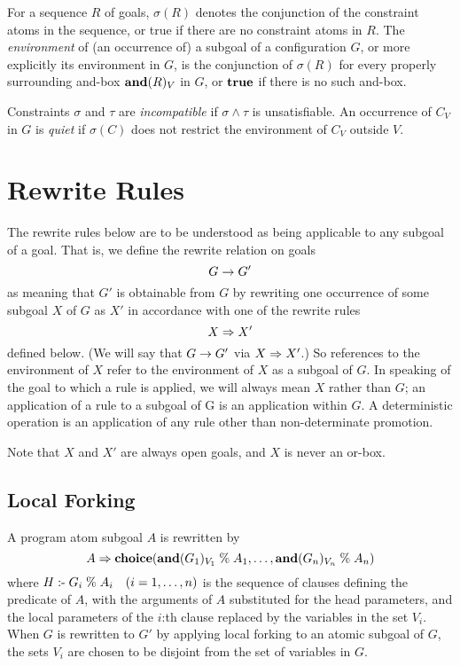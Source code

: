 For a sequence $R$ of goals, $\sigma(R)$ denotes the conjunction of
the constraint atoms in the sequence, or true if there are no
constraint atoms in $R$. The {\em environment} of (an occurrence of) a
subgoal of a configuration $G$, or more explicitly its environment in
$G$, is the conjunction of $\sigma(R)$ for every properly surrounding
and-box $\mbox{\bf and}(R)_V$ in $G$, or $\mbox{\bf true}$ if there is no such and-box.

Constraints $\sigma$ and $\tau$ are {\em incompatible} if
$\sigma\land\tau$ is unsatisfiable. An occurrence of $C_V$ in $G$ is
{\em quiet} if $\sigma(C)$ does not restrict the environment of $C_V$
outside $V$.

\section{Rewrite Rules}\label{REF3}

The rewrite rules below are to be understood as being applicable to any
subgoal of a goal.  That is, we define the rewrite relation on goals
%
$$G \rightarrow G'$$
%
as meaning that $G'$ is obtainable from $G$ by rewriting one
occurrence of some subgoal $X$ of $G$ as $X'$ in accordance with one
of the rewrite rules
%
$$X \Rightarrow X'$$
%
defined below. (We will say that $G \rightarrow G'$ via $X \Rightarrow
X'$.)  So references to the environment of $X$ refer to the
environment of $X$ as a subgoal of $G$.  In speaking of the goal to
which a rule is applied, we will always mean $X$ rather than $G$; an
application of a rule to a subgoal of G is an application within $G$.
A deterministic operation is an application of any rule other than
non-determinate promotion.

Note that $X$ and $X'$ are always open goals, and $X$ is never an
or-box.

\subsection*{Local Forking}

A program atom subgoal $A$ is rewritten by
%
$$A \Rightarrow \mbox{\bf choice}(\mbox{\bf and}(G_1)_{V_1} \mathrel{\mbox{\%}} A_1,\dots,\mbox{\bf and}(G_n)_{V_n} \mathrel{\mbox{\%}} A_n)$$
%
where $H \mathrel{\mbox{:-}} G_i \mathrel{\mbox{\%}} A_i\quad(i=1,\dots,n)$ is the sequence of
clauses defining the predicate of $A$, with the arguments of $A$
substituted for the head parameters, and the local parameters of the
$i$:th clause replaced by the variables in the set $V_i$. When $G$ is
rewritten to $G'$ by applying local forking to an atomic subgoal of
$G$, the sets $V_i$ are chosen to be disjoint from the set of
variables in $G$.

